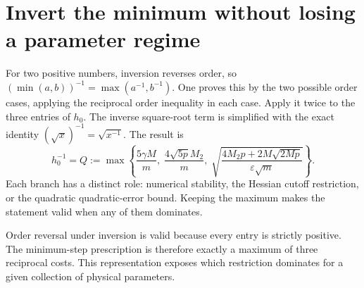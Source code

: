 \documentclass[11pt,a4paper]{article}
\begin{document}
\section{\texorpdfstring{Invert the minimum without losing a parameter regime}{Invert the minimum without losing a parameter regime}}


For two positive numbers, inversion reverses order, so \((\min(a,b))^{-1}=\max(a^{-1},b^{-1})\). One proves this by the two possible order cases, applying the reciprocal order inequality in each case. Apply it twice to the three entries of \(h_0\). The inverse square-root term is simplified with the exact identity \((\sqrt x)^{-1}=\sqrt{x^{-1}}\). The result is \[h_0^{-1}=Q:=\max\!\left\{\frac{5\gamma M}{m},\;\frac{4\sqrt{5p}M_2}{m},\;\sqrt{\frac{4M_2p+2M\sqrt{2Mp}}{\varepsilon\sqrt m}}\right\}.\] Each branch has a distinct role: numerical stability, the Hessian cutoff restriction, or the quadratic quadratic-error bound. Keeping the maximum makes the statement valid when any of them dominates.



Order reversal under inversion is valid because every entry is strictly positive. The minimum-step prescription is therefore exactly a maximum of three reciprocal costs. This representation exposes which restriction dominates for a given collection of physical parameters.
\end{document}
